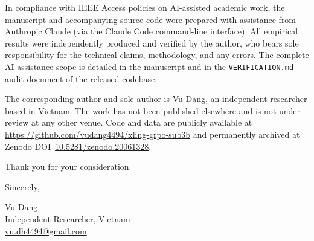 \documentclass[11pt]{article}
\begin{document}
In compliance with IEEE Access policies on AI-assisted academic work, the
manuscript and accompanying source code were prepared with assistance from
Anthropic Claude (via the Claude Code command-line interface). All
empirical results were independently produced and verified by the author,
who bears sole responsibility for the technical claims, methodology, and
any errors. The complete AI-assistance scope is detailed in the manuscript
and in the \texttt{VERIFICATION.md} audit document of the released
codebase.

The corresponding author and sole author is Vu Dang, an independent
researcher based in Vietnam. The work has not been published elsewhere and
is not under review at any other venue. Code and data are publicly
available at \url{https://github.com/vudang4494/xling-grpo-sub3b} and
permanently archived at Zenodo
DOI~\href{https://doi.org/10.5281/zenodo.20061328}{10.5281/zenodo.20061328}.

Thank you for your consideration.

\vspace{2em}

\noindent Sincerely,

\medskip

\noindent Vu Dang \\
Independent Researcher, Vietnam \\
\href{mailto:vu.dh4494@gmail.com}{vu.dh4494@gmail.com}
\end{document}
